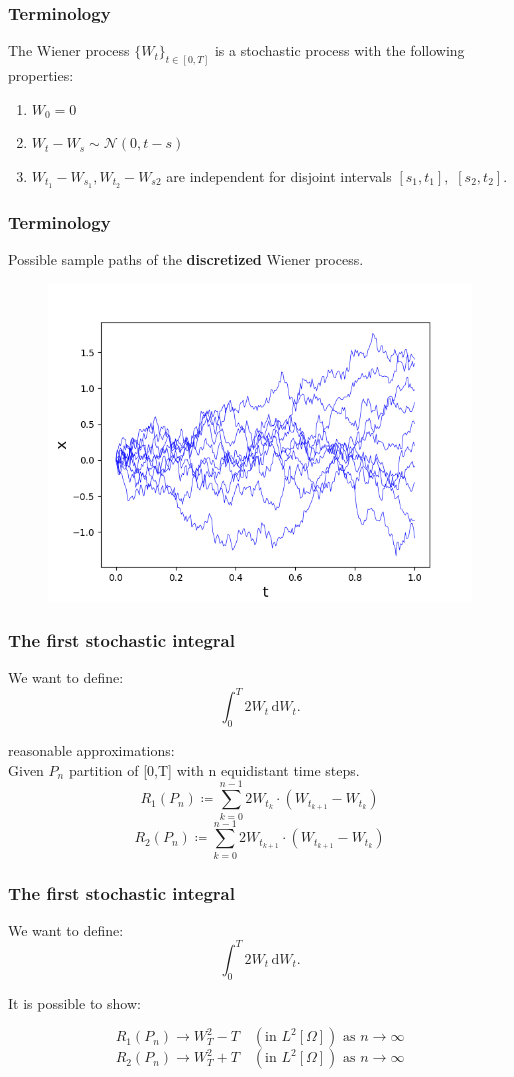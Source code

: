 \begin{frame}
\frametitle{Terminology}
\begin{definition}
The Wiener process \(\{W_t\}_{t\in[0,T]}\) is a stochastic process with the following properties:
\begin{enumerate}
\item \(W_0 = 0\)
\item \(W_t - W_s\sim\mathcal{N}(0,t-s)\)
\item \(W_{t_{1}} - W_{s_{1}}, W_{t_{2}}-W_{s{2}}\) are independent for disjoint intervals \([s_1,t_1],\,\,[s_2,t_2]\).
\end{enumerate}
\end{definition}
\end{frame}


\begin{frame}
\frametitle{Terminology}
Possible sample paths of the \textbf{discretized} Wiener process.\\
\begin{figure}
\includegraphics[width=0.75\linewidth]{Content/Graphics/slides/SamplingWiener}
\end{figure}
\end{frame}


\begin{frame}
\frametitle{The first stochastic integral}
We want to define:
\[\int_0^T \! 2W_t \, \mathrm{d}W_t.\]

reasonable approximations:\\
Given \(P_n\) partition of [0,T] with n equidistant time steps.
\[R_1(P_n) \coloneqq \sum_{k=0}^{n-1}2W_{t_k}\cdot(W_{t_{k+1}}-W_{t_k})\]			  
\[R_2(P_n) \coloneqq \sum_{k=0}^{n-1}2W_{t_{k+1}}\cdot(W_{t_{k+1}}-W_{t_k})\]
\end{frame}


\begin{frame}
\frametitle{The first stochastic integral}
We want to define:
\[\int_0^T \! 2W_t \, \mathrm{d}W_t.\]

It is possible to show:
\begin{lemma}
\[R_1(P_n) \rightarrow W_T^2 - T \quad  (\text{in } L^2[\Omega])\text{ as }n\to\infty\]
\[R_2(P_n) 	\rightarrow W_T^2 + T \quad       (\text{in } L^2[\Omega])\text{ as }n\to\infty\]
\end{lemma}
\end{frame}


